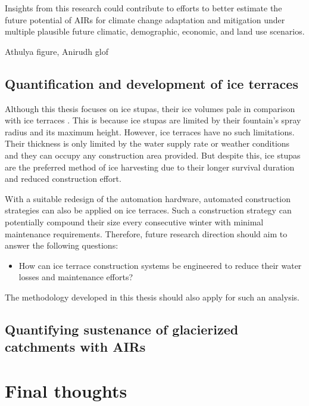 Insights from this research could contribute to efforts to better estimate the future potential of AIRs for
climate change adaptation and mitigation under multiple plausible future climatic, demographic, economic, and
land use scenarios. 

Athulya figure, Anirudh glof

\subsection{Quantification and development of ice terraces}

Although this thesis focuses on ice stupas, their ice volumes pale in comparison with ice terraces
\citep{nusserSociohydrologyArtificialGlaciers2019}. This is because ice stupas are limited by their fountain's
spray radius and its maximum height. However, ice terraces have no such limitations. Their thickness is only
limited by the water supply rate or weather conditions and they can occupy any construction area provided. But
despite this, ice stupas are the preferred method of ice harvesting due to their longer survival duration and
reduced construction effort.

With a suitable redesign of the automation hardware, automated construction strategies can also be applied on
ice terraces. Such a construction strategy can potentially compound their size every consecutive winter with
minimal maintenance requirements. Therefore, future research direction should aim to answer the following
questions:

\begin{itemize}

  \item How can ice terrace construction systems be engineered to reduce their water losses and maintenance
    efforts?

\end{itemize}

The methodology developed in this thesis should also apply for such an analysis.

\subsection{Quantifying sustenance of glacierized catchments with AIRs}

\section{Final thoughts}

